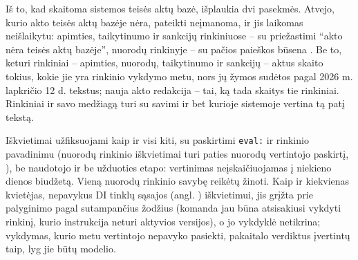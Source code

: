 Iš to, kad skaitoma sistemos teisės aktų bazė, išplaukia dvi pasekmės. Atvejo, kurio akto
teisės aktų bazėje nėra, pateikti neįmanoma, ir jis laikomas neišlaikytu: apimties,
taikytinumo ir sankcijų rinkiniuose -- su priežastimi \enquote{akto nėra teisės aktų bazėje},
nuorodų rinkinyje -- su pačios paieškos būsena . Be to, keturi
rinkiniai -- apimties, nuorodų, taikytinumo ir sankcijų -- aktus skaito tokius, kokie jie
yra rinkinio vykdymo metu, nors jų žymos sudėtos pagal 2026 m. lapkričio 12 d. tekstus; nauja
akto redakcija -- tai, ką tada skaitys tie rinkiniai. Rinkiniai  ir 
savo medžiagą turi su savimi ir bet kurioje sistemoje vertina tą patį tekstą.

Iškvietimai užfiksuojami kaip ir visi kiti, su paskirtimi \texttt{eval:} ir rinkinio
pavadinimu (nuorodų rinkinio iškvietimai turi paties nuorodų vertintojo paskirtį,
), be naudotojo ir be užduoties etapo: vertinimas neįskaičiuojamas į
niekieno dienos biudžetą. Vieną nuorodų rinkinio savybę reikėtų žinoti. Kaip ir kiekvienas
 kvietėjas, nepavykus DI tinklų sąsajos (angl. )
iškvietimui, jis grįžta prie palyginimo pagal sutampančius žodžius (komanda jau būna
atsisakiusi vykdyti rinkinį, kurio instrukcija neturi aktyvios versijos), o jo vykdyklė
 netikrina; vykdymas, kurio metu vertintojo nepavyko pasiekti, pakaitalo
verdiktus įvertintų taip, lyg jie būtų modelio.

